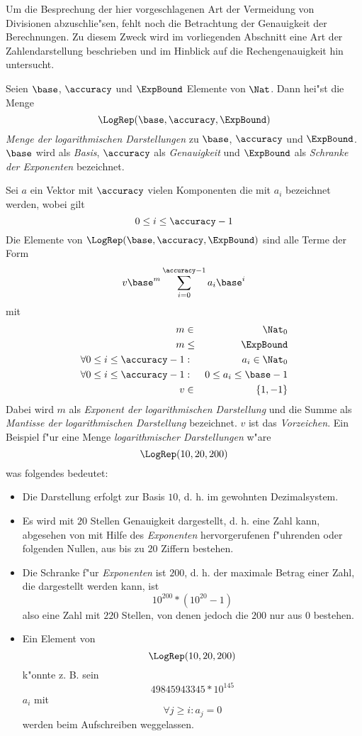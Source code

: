 \label{BGH82Par7}
Um die Besprechung der hier vorgeschlagenen Art der Vermeidung von
Divisionen abzuschlie"sen, fehlt noch die Betrachtung der Genauigkeit
der Berechnungen. Zu diesem Zweck wird im vorliegenden Abschnitt eine 
Art der Zahlendarstellung beschrieben und im Hinblick auf die
Rechengenauigkeit hin untersucht.

\MyBeginDef
    Seien $\base$, $\accuracy$ und $\ExpBound$ Elemente von $\Nat$.
    Dann hei"st die Menge \[ \LogRep(\base,\accuracy,\ExpBound) \]
    {\em Menge der logarithmischen Darstellungen} zu $\base$, $\accuracy$
     und $\ExpBound$.
    $\base$ wird als {\em Basis}, $\accuracy$ als {\em Genauigkeit} und
    $\ExpBound$ als {\em Schranke der Exponenten} bezeichnet.
    
    Sei $a$ ein Vektor mit $\accuracy$ vielen Komponenten die mit $a_i$
    bezeichnet werden, wobei gilt \[ 0 \leq i \leq \accuracy-1 \]
    Die Elemente
    von $\LogRep(\base,\accuracy,\ExpBound)$ sind alle Terme der Form
    \[ v \base^m\sum_{i=0}^{\accuracy-1}a_i\base^i \]
    mit
    \begin{eqnarray*}
        m & \in & \Nat_0 \\
        m & \leq & \ExpBound \\
        \forall 0 \leq i \leq \accuracy-1 & : & a_i \in \Nat_0 \\
        \forall 0 \leq i \leq \accuracy-1 & : & 0 \leq a_i \leq \base-1 \\
        v & \in & \{ 1,-1 \}
    \end{eqnarray*}
    Dabei wird $m$ als {\em Exponent der logarithmischen Darstellung}
    und die Summe als {\em Mantisse der logarithmischen
    Darstellung} bezeichnet. $v$ ist das {\em Vorzeichen}.
\MyEndDef
Ein Beispiel f"ur eine Menge {\em logarithmischer Darstellungen} w"are
\[ \LogRep(10,20,200) \]
was folgendes bedeutet:
\begin{itemize}
    \item Die Darstellung erfolgt zur Basis $10$, d. h. im gewohnten
          Dezimalsystem.
    \item Es wird mit $20$ Stellen Genauigkeit dargestellt, d. h. eine
          Zahl kann, abgesehen von mit Hilfe des {\em Exponenten}
          hervorgerufenen f"uhrenden oder folgenden Nullen, aus bis zu
          $20$ Ziffern bestehen.
    \item Die Schranke f"ur {\em Exponenten} ist $200$, d. h. der
          maximale Betrag einer Zahl, die dargestellt werden kann, ist
          \[ 10^{200}*(10^{20}-1) \]
          also eine Zahl mit $220$ Stellen, von denen jedoch die $200$
          nur aus $0$ bestehen.
    \item Ein Element von \[ \LogRep(10,20,200) \] k"onnte z. B. sein
          \[ 49845943345 * 10^{145} \]
          $a_i$ mit \[ \forall j \geq i : a_j= 0 \] werden beim
          Aufschreiben weggelassen.
\end{itemize}

